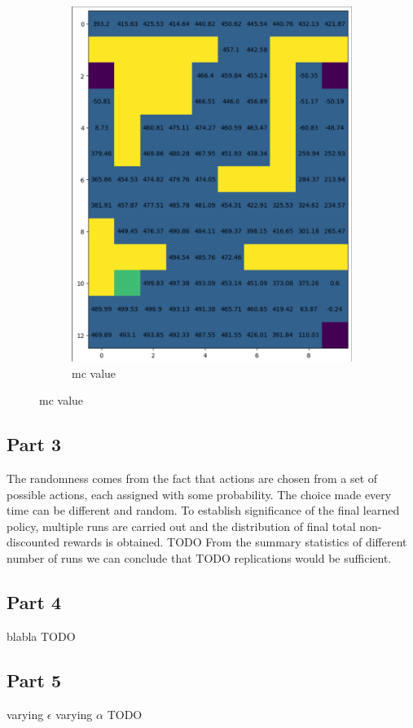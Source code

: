 \documentclass{article}
\begin{document}
\begin{figure}[h]
\begin{subfigure} {0.5\textwidth}
            \includegraphics[width=0.9\linewidth]{images/mc_value}
            \caption{mc value}\label{fig:mc_value}
        \end{subfigure}
    \end{figure}

    \subsection{Part 3}
    The randomness comes from the fact that actions are chosen from a set of possible actions, each assigned with some probability.
    The choice made every time can be different and random.
    To establish significance of the final learned policy, multiple runs are carried out and the distribution of final total non-discounted rewards is obtained.
    TODO From the summary statistics of different number of runs we can conclude that TODO replications would be sufficient.

    \subsection{Part 4}
    blabla TODO

    \subsection{Part 5}
    varying $\epsilon$
    varying $\alpha$
    TODO
\end{document}
